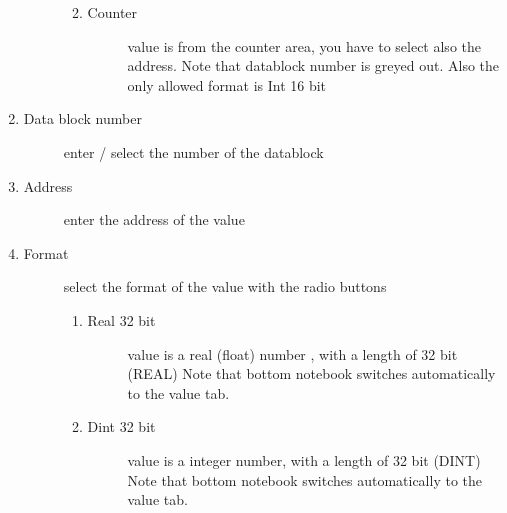 \documentclass[a4paper,10pt,english]{sphinxmanual}
\begin{document}
\begin{enumerate}
\begin{description}
\begin{enumerate}
\begin{description}
\end{description}

\item {} \begin{description}
\item[{Counter}] \leavevmode
value is from the counter area, you have to select also  the address.
Note that datablock number is greyed out.
Also the only allowed format is Int 16 bit

\end{description}

\end{enumerate}

\end{description}

\item {} \begin{description}
\item[{Data block number}] \leavevmode
enter / select the number of the datablock

\end{description}

\item {} \begin{description}
\item[{Address}] \leavevmode
enter the address of the value

\end{description}

\item {} \begin{description}
\item[{Format}] \leavevmode
select the format of the value with the radio buttons
\begin{enumerate}
%
\item {} \begin{description}
\item[{Real 32 bit}] \leavevmode
value is a real (float) number , with a length of 32 bit (REAL)
Note that bottom notebook switches automatically to the value tab.

\end{description}

\item {} \begin{description}
\item[{Dint 32 bit}] \leavevmode
value is a integer number, with a length of 32 bit (DINT)
Note that bottom notebook switches automatically to the value tab.


\end{description}
\end{enumerate}
\end{description}
\end{enumerate}
\end{document}
